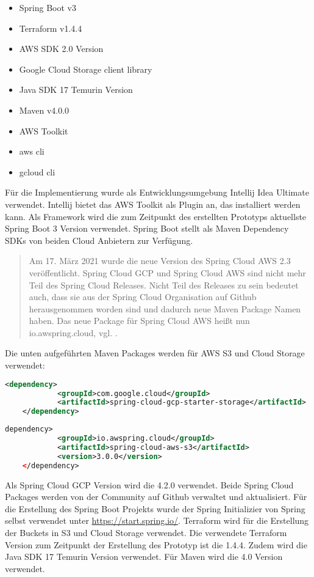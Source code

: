 \begin{itemize}
	\item Spring Boot v3
	\item Terraform v1.4.4
	\item AWS SDK 2.0 Version
	\item Google Cloud Storage client library
	\item Java SDK 17 Temurin Version
	\item Maven v4.0.0
	\item AWS Toolkit
	\item aws cli
	\item gcloud cli
\end{itemize}

Für die Implementierung wurde als Entwicklungsumgebung Intellij Idea Ultimate verwendet. Intellij bietet das AWS Toolkit als Plugin an, das installiert werden kann. Als Framework wird die zum Zeitpunkt des erstellten Prototyps aktuellste Spring Boot 3 Version verwendet. Spring Boot stellt als Maven Dependency SDKs von beiden Cloud Anbietern zur Verfügung.

\begin{quote}
	Am 17. März 2021 wurde die neue Version des Spring Cloud AWS 2.3 veröffentlicht. Spring Cloud GCP und Spring Cloud AWS sind nicht mehr Teil des Spring Cloud Releases. Nicht Teil des Releases zu sein bedeutet auch, dass sie aus der Spring Cloud Organisation auf Github herausgenommen worden sind und dadurch neue Maven Package Namen haben. Das neue Package für Spring Cloud AWS heißt nun \glqq io.awspring.cloud\grqq, vgl. \cite{spring-cloud-announce}. 
\end{quote}

Die unten aufgeführten Maven Packages werden für AWS S3 und Cloud Storage verwendet:

\begin{lstlisting}[language=XML]
	<dependency>
        	<groupId>com.google.cloud</groupId>
        	<artifactId>spring-cloud-gcp-starter-storage</artifactId>
    </dependency>
\end{lstlisting}

\begin{lstlisting}[language=XML]
	dependency>
        	<groupId>io.awspring.cloud</groupId>
        	<artifactId>spring-cloud-aws-s3</artifactId>
        	<version>3.0.0</version>
    </dependency>
\end{lstlisting}

Als Spring Cloud GCP Version wird die 4.2.0 verwendet. Beide Spring Cloud Packages werden von der Community auf Github verwaltet und aktualisiert. Für die Erstellung des Spring Boot Projekts wurde der Spring Initializier von Spring selbst verwendet unter \url{https://start.spring.io/}. Terraform wird für die Erstellung der Buckets in S3 und Cloud Storage verwendet. Die verwendete Terraform Version zum Zeitpunkt der Erstellung des Prototyp ist die 1.4.4. Zudem wird die Java SDK 17 Temurin Version verwendet. Für Maven wird die 4.0 Version verwendet.\\

